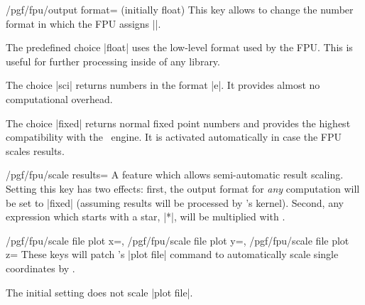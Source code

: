 \begin{key}{/pgf/fpu/output format= (initially float)}
    This key allows to change the number format in which the FPU assigns
    |\pgfmathresult|.

    The predefined choice |float| uses the low-level format used by the FPU.
    This is useful for further processing inside of any library.
\begin{codeexample}[preamble={\usepgflibrary{fpu}}]
\pgfmathresult
\end{codeexample}

    The choice |sci| returns numbers in the format
    |e|. It provides almost no computational
    overhead.
\begin{codeexample}[preamble={\usepgflibrary{fpu}}]
\pgfmathresult
\end{codeexample}

    The choice |fixed| returns normal fixed point numbers and provides the
    highest compatibility with the \pgfname\ engine. It is activated
    automatically in case the FPU scales results.
\begin{codeexample}[preamble={\usepgflibrary{fpu}}]
\pgfmathresult
\end{codeexample}
\end{key}

\begin{key}{/pgf/fpu/scale results=}
    A feature which allows semi-automatic result scaling. Setting this key has
    two effects: first, the output format for \emph{any} computation will be
    set to |fixed| (assuming results will be processed by \pgfname's kernel).
    Second, any expression which starts with a star, |*|, will be multiplied
    with .
\end{key}

\begin{keylist}{
    /pgf/fpu/scale file plot x=,%
    /pgf/fpu/scale file plot y=,%
    /pgf/fpu/scale file plot z=%
}
    These keys will patch \pgfname's |plot file| command to automatically scale
    single coordinates by .

    The initial setting does not scale |plot file|.
\end{keylist}

